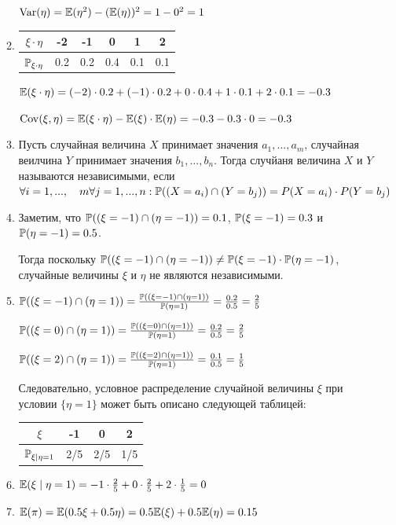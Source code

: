 \documentclass[12pt, a4paper]{article}\usepackage[]{graphicx}\usepackage[]{color}
\begin{document}
\begin{enumerate}
\begin{enumerate}
								$\Var(\eta) = \E(\eta^2)-(\E(\eta))^2 = 1 - 0^2 = 1$

								\item \begin{tabular}{c|ccccc}
									$\xi \cdot \eta$ & -2 & -1 & 0 & 1 & 2 \\ \hline
									$\P_{\xi \cdot \eta}$ & 0.2 & 0.2 & 0.4 & 0.1 & 0.1
								\end{tabular}

								$\E(\xi\cdot\eta) = (-2) \cdot 0.2 + (-1) \cdot 0.2 + 0 \cdot 0.4 + 1\cdot 0.1 + 2 \cdot 0.1 = -0.3$

								$\Cov(\xi, \eta) = \E(\xi\cdot\eta) - \E(\xi)\cdot\E(\eta) = -0.3 - 0.3 \cdot 0 = -0.3$
								\item Пусть случайная величина $X$ принимает значения $a_1, ..., a_m$, случайная веилчина $Y$ принимает значения $b_1, ..., b_n$. Тогда случйаня величина $X$ и $Y$ называются независимыми, если $\forall i=1, ..., \quad m \forall j=1, ..., n: \P((X = a_i) \cap (Y = b_j)) = P(X = a_i) \cdot P(Y = b_j)$
								\item Заметим, что $\P ((\xi = -1) \cap (\eta=-1))=0.1$, $\P(\xi=-1)=0.3$ и $\P(\eta=-1)=0.5$.

								Тогда поскольку $\P ((\xi = -1) \cap (\eta=-1)) \neq \P(\xi=-1) \cdot \P(\eta=-1)$, случайные величины $\xi$ и $\eta$ не являются независимыми.
								\item $\P ((\xi = -1) \cap (\eta=1)) = \frac{\P ((\xi = -1) \cap (\eta=1))}{\P(\eta=1)} = \frac{0.2}{0.5} = \frac{2}{5}$

								$\P ((\xi = 0) \cap (\eta=1)) = \frac{\P ((\xi = 0) \cap (\eta=1))}{\P(\eta=1)} = \frac{0.2}{0.5} = \frac{2}{5}$

								$\P ((\xi = 2) \cap (\eta=1)) = \frac{\P ((\xi = 2) \cap (\eta=1))}{\P(\eta=1)} = \frac{0.1}{0.5} = \frac{1}{5}$

								Следовательно, условное распределение случайной величины $\xi$ при условии $\{\eta=1\}$ может быть описано следующей таблицей:

								\begin{tabular}{c|ccc}
									$\xi$ & -1 & 0 & 2 \\ \hline
									$\P_{\xi \mid \eta=1}$ & 2/5 & 2/5 & 1/5
								\end{tabular}
								\item $\E(\xi \mid \eta = 1) = -1 \cdot \frac{2}{5} + 0 \cdot \frac{2}{5} + 2 \cdot \frac{1}{5} = 0$
								\item $\E(\pi) = \E(0.5 \xi + 0.5 \eta) = 0.5 \E(\xi) + 0.5 \E(\eta) = 0.15$


\end{enumerate}
\end{enumerate}
\end{document}
